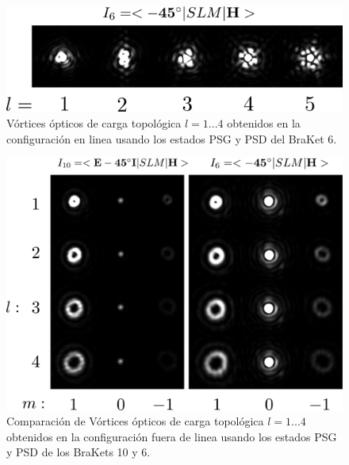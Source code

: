 \begin{figure}[H]
\centering
\includegraphics[scale=0.4]{OV_I6.pdf}
\caption[Vórtices ópticos obtenidos en la configuración en linea para
el BraKet 6]{Vórtices ópticos de carga topológica $l=1...4$ obtenidos
  en la configuración en linea usando los estados PSG y PSD del BraKet 6.} 
\label{fig:VOs_I10}
\end{figure}

\begin{figure}[H]
\centering
\includegraphics[scale=0.35]{diffracted_OV_I6_and_I10.pdf}
\caption[Vórtices ópticos difractados por una rejilla tipo
blazed.]{Comparación de Vórtices ópticos de carga topológica $l=1...4$ obtenidos en
  la configuración fuera de linea usando los estados PSG y PSD de los
  BraKets 10 y 6.} 
\label{fig:diffracted_OV_I6_and_I10}
\end{figure}
\newpage
\pagebreak[4]
